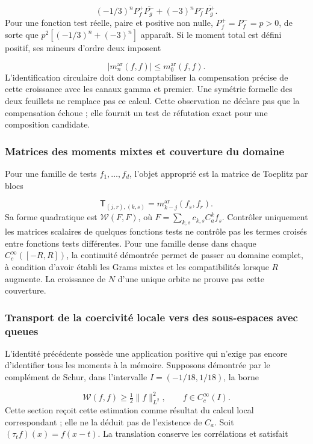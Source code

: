\[
(-1/3)^nP_f^+\overline{P_g^-}
+(-3)^nP_f^-\overline{P_g^+}.
\]
Pour une fonction test réelle, paire et positive non nulle, \(P_f^+=P_f^-=p>0\), de sorte que \(p^2[(-1/3)^n+(-3)^n]\) apparaît. Si le moment total est défini positif, ses mineurs d'ordre deux imposent

\[
|m_n^{\mathrm{ar}}(f,f)|\le m_0^{\mathrm{ar}}(f,f).
\]
L'identification circulaire doit donc comptabiliser la compensation précise de cette croissance avec les canaux gamma et premier. Une symétrie formelle des deux feuillets ne remplace pas ce calcul. Cette observation ne déclare pas que la compensation échoue ; elle fournit un test de réfutation exact pour une composition candidate.


\subsubsection{Matrices des moments mixtes et couverture du domaine}
\label{viii:tm-add-m6-2}
Pour une famille de tests \(f_1,\ldots,f_d\), l'objet approprié est la matrice de Toeplitz par blocs

\[
\mathsf T_{(j,r),(k,s)}
=m_{k-j}^{\mathrm{ar}}(f_s,f_r).
\]
Sa forme quadratique est \(\mathscr W(F,F)\), où \(F=\sum_{k,s}c_{k,s}C_a^k f_s\). Contrôler uniquement les matrices scalaires de quelques fonctions tests ne contrôle pas les termes croisés entre fonctions tests différentes. Pour une famille dense dans chaque \(C_c^\infty([-R,R])\), la continuité démontrée permet de passer au domaine complet, à condition d'avoir établi les Grams mixtes et les compatibilités lorsque \(R\) augmente. La croissance de \(N\) d'une unique orbite ne prouve pas cette couverture.


\subsubsection{Transport de la coercivité locale vers des sous-espaces avec queues}
\label{viii:tm-add-m6-3}
\label{viii:tm-add:familias-transportadas}
L'identité précédente possède une application positive qui n'exige pas encore d'identifier tous les moments à la mémoire. Supposons démontrée par le complément de Schur, dans l'intervalle \(I=(-1/18,1/18)\), la borne

\[
\mathscr W(f,f)\geq\tfrac12\|f\|_{L^2}^2,
\qquad f\in C_c^\infty(I).
\]
Cette section reçoit cette estimation comme résultat du calcul local correspondant ; elle ne la déduit pas de l'existence de \(C_a\). Soit \((\tau_t f)(x)=f(x-t)\). La translation conserve les corrélations et satisfait

